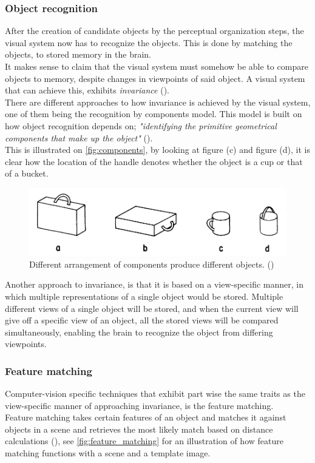 \documentclass{article}
\newcommand{\goodcite}[1]{ {(\cite{#1})}}
\begin{document}
\subsubsection{Object recognition}
After the creation of candidate objects by the perceptual organization steps, the visual system now has to recognize the objects. This is done by matching the objects, to stored memory in the brain.\\

It makes sense to claim that the visual system must somehow be able to compare objects to memory, despite changes in viewpoints of said object. A visual system that can achieve this, exhibits \textit{invariance}\goodcite{hsp}.\\There are different approaches to how invariance is achieved by the visual system, one of them being the recognition by components model. This model is built on how object recognition depends on; \textit{"identifying the primitive geometrical components that make up the object"}\goodcite{hsp}.\\This is illustrated on \autoref{fig:components}, by looking at figure (c) and figure (d), it is clear how the location of the handle denotes whether the object is a cup or that of a bucket.

\begin{figure}[H]
    \centering
    \includegraphics[width=\textwidth]{img/comps.png}
    \caption{Different arrangement of components produce different objects.\goodcite{bieder}}
    \label{fig:components}
\end{figure}

Another approach to invariance, is that it is based on a view-specific manner, in which multiple representations of a single object would be stored. Multiple different views of a single object will be stored, and when the current view will give off a specific view of an object, all the stored views will be compared simultaneously, enabling the brain to recognize the object from differing viewpoints.\medskip \\

\subsubsection{Feature matching}
Computer-vision specific techniques that exhibit part wise the same traits as the view-specific manner of approaching invariance, is the feature matching.\\Feature matching takes certain features of an object and matches it against objects in a scene and retrieves the most likely match based on distance calculations\goodcite{OpenCV}, see \autoref{fig:feature_matching} for an illustration of how feature matching functions with a scene and a template image.\medskip \\
\end{document}
